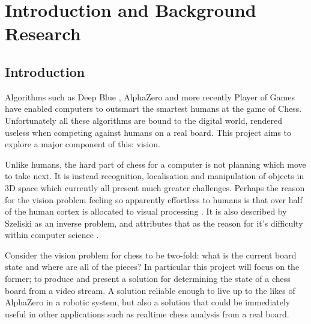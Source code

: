 \chapter{Introduction and Background Research}

\label{chapter1}

\section{Introduction}

Algorithms such as Deep Blue \cite{CAMPBELL200257}, AlphaZero \cite{silver2018general} and more recently Player of Games\cite{schmid2021player}
have enabled computers to outsmart the smartest humans at the game of Chess.
Unfortunately all these algorithms are bound to the digital world, rendered useless when
competing against humans on a real board.  This project aims to explore a major component of this: vision.

Unlike humans, the hard part of chess for a computer is not planning which move to take next.  It is instead recognition,
localisation and manipulation of objects in 3D space which currently all present much greater challenges.
Perhaps the reason for the vision problem feeling so apparently effortless to humans is that over half of the human cortex is allocated
to visual processing \cite{snowden2012basic}.
It is also described by Szeliski as an inverse problem, and attributes that as the reason for it's difficulty
within computer science \cite{szeliski2011computer}.

Consider the vision problem for chess to be two-fold: what is the current board state and where are all of the pieces?
In particular this project will focus on the former; to produce and present a solution for determining the
state of a chess board from a video stream.  A solution reliable enough to live up to the likes of AlphaZero
in a robotic system,
but also a solution that could be immediately useful in other applications such as realtime chess analysis from a real board.


